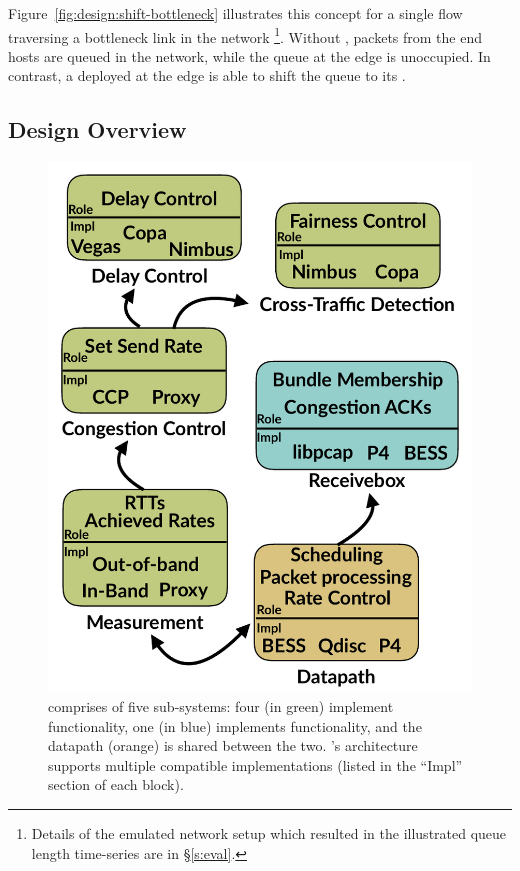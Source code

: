 Figure~\ref{fig:design:shift-bottleneck} illustrates this concept for a single flow traversing a bottleneck link in the network
\footnote{Details of the emulated network setup which resulted in the illustrated queue length time-series are in \S\ref{s:eval}.}.
Without \name, packets from the end hosts are queued in the network, while the queue at the edge is unoccupied. 
In contrast, a \name deployed at the edge is able to shift the queue to its \inbox.

\subsection{Design Overview}\label{s:design:overview}
\begin{figure}
    \centering
    \includegraphics[width=\columnwidth]{img/arch-block-diag}
    \caption{\name comprises of five sub-systems: four (in green) implement \inbox functionality, one (in blue) implements \outbox functionality, and the datapath (orange) is shared between the two. \name's architecture supports multiple compatible implementations (listed in the ``Impl'' section of each block).}\label{fig:design:block-diag}
\end{figure}
